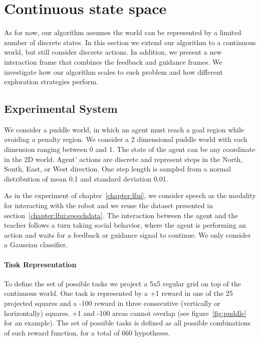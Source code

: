 \section{Continuous state space}
\label{chapter:limitations:continousstate}


As for now, our algorithm assumes the world can be represented by a limited number of discrete states. In this section we extend our algorithm to a continuous world, but still consider discrete actions. In addition, we present a new interaction frame that combines the feedback and guidance frames. We investigate how our algorithm scales to such problem and how different exploration strategies perform.

\subsection{Experimental System}

We consider a puddle world, in which an agent must reach a goal region while avoiding a penalty region. We consider a 2 dimensional puddle world with each dimension ranging between 0 and 1. The state of the agent can be any coordinate in the 2D world. Agent' actions are discrete and represent steps in the North, South, East, or West direction. One step length is sampled from a normal distribution of mean 0.1 and standard deviation 0.01.

As in the experiment of chapter~\ref{chapter:lfui}, we consider speech as the modality for interacting with the robot and we reuse the dataset presented in section~\ref{chapter:lfui:speechdata}. The interaction between the agent and the teacher follows a turn taking social behavior, where the agent is performing an action and waits for a feedback or guidance signal to continue. We only consider a Gaussian classifier.

\paragraph{Task Representation} 

To define the set of possible tasks we project a 5x5 regular grid on top of the continuous world. One task is represented by a +1 reward in one of the 25 projected squares and a -100 reward in three consecutive (vertically or horizontally) squares. +1 and -100 areas cannot overlap (see figure~\ref{fig:puddle} for an example). The set of possible tasks is defined as all possible combinations of such reward function, for a total of 660 hypotheses.


